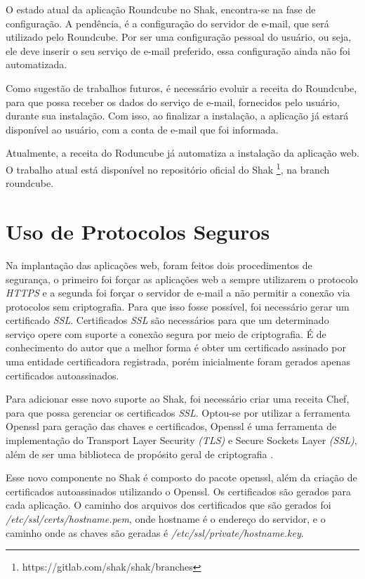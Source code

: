 O estado atual da aplicação Roundcube no Shak, encontra-se na fase de configuração. A pendência,
é a configuração do servidor de e-mail, que será utilizado pelo Roundcube. Por ser
uma configuração pessoal do usuário, ou seja, ele deve inserir o seu serviço
de e-mail preferido, essa configuração ainda não foi automatizada. 

Como sugestão de trabalhos futuros, é necessário evoluir a receita do Roundcube, 
para que possa receber os dados do serviço de e-mail, fornecidos pelo usuário, 
durante sua instalação. Com isso, ao finalizar a instalação, a aplicação já 
estará disponível ao usuário, com a conta de e-mail que foi informada.

Atualmente, a receita do Roduncube já automatiza a instalação da aplicação web. 
O trabalho atual está disponível no repositório oficial do Shak \footnote{https://gitlab.com/shak/shak/branches}, na branch roundcube.

\section{Uso de Protocolos Seguros}
\label{sub:seguranca}

Na implantação das aplicações web, foram feitos dois procedimentos de segurança, o primeiro
foi forçar as aplicações web a sempre utilizarem o protocolo \textit{HTTPS} e a segunda foi forçar o
servidor de e-mail a não permitir a conexão via protocolos sem criptografia. Para que 
isso fosse possível, foi necessário gerar um certificado \textit{SSL}. Certificados 
\textit{SSL} são necessários para que um determinado serviço opere com suporte 
a conexão segura por meio de criptografia.
É de conhecimento do autor que a melhor forma é obter um certificado assinado
por uma entidade certificadora registrada, porém inicialmente foram gerados apenas certificados
autoassinados.

Para adicionar esse novo suporte ao Shak, foi necessário criar uma receita Chef,
para que possa gerenciar os certificados \textit{SSL}. Optou-se por utilizar a ferramenta
Openssl para geração das chaves e certificados, Openssl é uma ferramenta de
implementação do Transport Layer Security \textit{(TLS)} e Secure Sockets Layer \textit{(SSL)},
além de ser uma biblioteca de propósito geral de criptografia \cite{openssl}.

Esse novo componente no Shak é composto do pacote openssl, além da criação
de certificados autoassinados utilizando o Openssl. Os certificados são gerados 
para cada aplicação. O caminho dos arquivos dos certificados que 
são gerados foi \textit{/etc/ssl/certs/hostname.pem}, onde hostname é o endereço 
do servidor,
e o caminho onde as chaves são geradas é \textit{/etc/ssl/private/hostname.key}.

